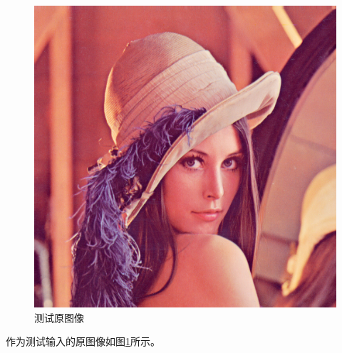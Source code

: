 \documentclass{article}
\numberwithin {equation}{section}
\begin{document}
\begin{spacing}{1.25}
  \begin{figure}[H]
    \centering
    \includegraphics[scale=0.4]{../src/test/test_img512x512.png}
    \caption{测试原图像}
    \label{origin image}
  \end{figure}

  作为测试输入的原图像如图\ref{origin image}所示。


\end{spacing}
\end{document}
